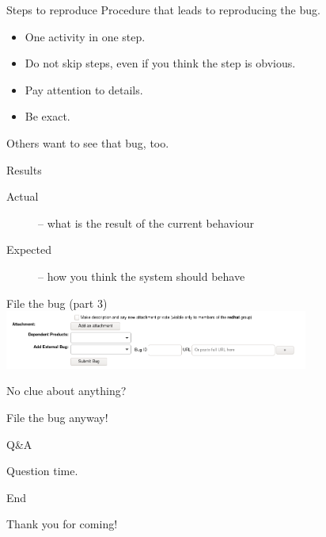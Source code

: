 \documentclass[12pt]{beamer}
\begin{document}
\begin{frame}{Steps to reproduce}
Procedure that leads to reproducing the bug.
\begin{itemize}
	\item One activity in one step.
	\item Do not skip steps, even if you think the step is obvious.
	\item Pay attention to details.
	\item Be exact.
\end{itemize}
Others want to see that bug, too. 
\end{frame}

\begin{frame}{Results}
\begin{description}
	\item[Actual] -- what is the result of the current behaviour
	\item[Expected] -- how you think the system should behave
\end{description}
\end{frame}

\begin{frame}{File the bug (part 3)}
\includegraphics[width=10cm]{images/bz_footer.png}
\end{frame}

\begin{frame}{No clue about anything?}

{\Large File the bug anyway!}
\end{frame}

\begin{frame}{Q\&A}

{\Large Question time.}
\end{frame}

\begin{frame}{End}

{\Large Thank you for coming!}
\end{frame}
\end{document}
